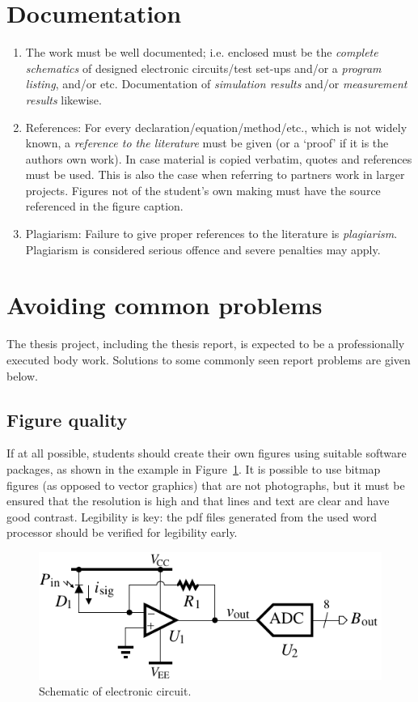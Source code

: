 \section{Documentation}

\begin{enumerate}
\item
The work must be well documented; i.e. enclosed must be the \emph{complete
schematics} of designed electronic circuits/test set-ups and/or a
\emph{program listing}, and/or etc.
Documentation of \emph{simulation results} and/or \emph{measurement
results} likewise.
\item References:
For every declaration/equation/method/etc., which is not widely known,
a \emph{reference to the literature} must be given (or a `proof' if it is
the authors own work).
In case material is copied verbatim, quotes and references must be used.
This is also the case when referring to partners
work in larger projects.  Figures not of the student's own making must have
the source referenced in the figure caption.

\item Plagiarism:
Failure to give proper references to the literature is \emph{plagiarism}.
Plagiarism is considered serious offence and severe penalties may apply.

\end{enumerate}

\section{Avoiding common problems}

The thesis project, including the thesis report, is expected to be a
professionally executed body work.  Solutions to some commonly seen report
problems are given below.

\subsection{Figure quality}
If at all possible, students should create their own figures using
suitable software packages, as shown in the example
in Figure~\ref{fig-schematic}.  It is possible to use bitmap figures (as
opposed to vector graphics) that are not photographs, but it must be ensured
that the resolution is high
and that lines and text are clear and have good contrast.
Legibility is key: the pdf files generated from the used
word processor should be verified for legibility early.

\begin{figure}[ht!]
\centering
\includegraphics{schematic}
\caption{Schematic of electronic circuit.}
\label{fig-schematic}
\end{figure}

